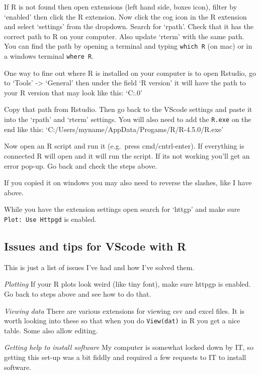 \documentclass[
  letterpaper,
  DIV=11,
  numbers=noendperiod]{scrreprt}
\begin{document}
If R is not found then open extensions (left hand side, boxes icon),
filter by `enabled' then click the R extension. Now click the cog icon
in the R extension and select `settings' from the dropdown. Search for
`rpath'. Check that it has the correct path to R on your computer. Also
update `rterm' with the same path. You can find the path by opening a
terminal and typing \texttt{which\ R} (on mac) or in a windows terminal
\texttt{where\ R}.

One way to fine out where R is installed on your computer is to open
Rstudio, go to `Tools' -\textgreater{} `General' then under the field `R
version' it will have the path to your R version that may look like
this: `C:\Users\myname\AppData\Progams\R{}.0'

Copy that path from Rstudio. Then go back to the VScode settings and
paste it into the `rpath' and `rterm' settings. You will also need to
add the \texttt{R.exe} on the end like this:
`C:/Users/myname/AppData/Progams/R/R-4.5.0/R.exe'

Now open an R script and run it (e.g.~press cmd/cntrl-enter). If
everything is connected R will open and it will run the script. If its
not working you'll get an error pop-up. Go back and check the steps
above.

If you copied it on windows you may also need to reverse the slashes,
like I have above.

While you have the extension settings open search for `httgp' and make
sure \texttt{Plot:\ Use\ Httpgd} is enabled.

\subsection{Issues and tips for VScode with
R}\label{issues-and-tips-for-vscode-with-r}

This is just a list of issues I've had and how I've solved them.

\emph{Plotting} If your R plots look weird (like tiny font), make sure
httpgp is enabled. Go back to steps above and see how to do that.

\emph{Viewing data} There are various extensions for viewing csv and
excel files. It is worth looking into these so that when you do
\texttt{View(dat)} in R you get a nice table. Some also allow editing.

\emph{Getting help to install software} My computer is somewhat locked
down by IT, so getting this set-up was a bit fiddly and required a few
requests to IT to install software.
\end{document}
